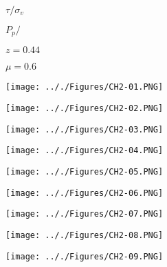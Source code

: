 \documentclass[onecolumn,11pt]{report}
\def\lthtmlcheckvsize{\ifdim\ht\sizebox<\vsize 
  \ifdim\wd\sizebox<\hsize\expandafter\hfill\fi \expandafter\vfill
  \else\expandafter\vss\fi}%
\begin{document}
{\newpage\clearpage
{}%
$ \tau / \sigma_v$%
\lthtmlindisplaymathZ
\lthtmlcheckvsize\clearpage}

{\newpage\clearpage
{}%
$ P_p/$%
\lthtmlindisplaymathZ
\lthtmlcheckvsize\clearpage}

{\newpage\clearpage
{}%
$ z = 0.44$%
\lthtmlindisplaymathZ
\lthtmlcheckvsize\clearpage}

{\newpage\clearpage
{}%
$ \mu = 0.6$%
\lthtmlindisplaymathZ
\lthtmlcheckvsize\clearpage}

{\newpage\clearpage
{}%
\texttt{[image: .././Figures/CH2-01.PNG]}%
\lthtmlpictureZ
\lthtmlcheckvsize\clearpage}

{\newpage\clearpage
{}%
\texttt{[image: .././Figures/CH2-02.PNG]}%
\lthtmlpictureZ
\lthtmlcheckvsize\clearpage}

{\newpage\clearpage
{}%
\texttt{[image: .././Figures/CH2-03.PNG]}%
\lthtmlpictureZ
\lthtmlcheckvsize\clearpage}

{\newpage\clearpage
{}%
\texttt{[image: .././Figures/CH2-04.PNG]}%
\lthtmlpictureZ
\lthtmlcheckvsize\clearpage}

{\newpage\clearpage
{}%
\texttt{[image: .././Figures/CH2-05.PNG]}%
\lthtmlpictureZ
\lthtmlcheckvsize\clearpage}

{\newpage\clearpage
{}%
\texttt{[image: .././Figures/CH2-06.PNG]}%
\lthtmlpictureZ
\lthtmlcheckvsize\clearpage}

{\newpage\clearpage
{}%
\texttt{[image: .././Figures/CH2-07.PNG]}%
\lthtmlpictureZ
\lthtmlcheckvsize\clearpage}

{\newpage\clearpage
{}%
\texttt{[image: .././Figures/CH2-08.PNG]}%
\lthtmlpictureZ
\lthtmlcheckvsize\clearpage}

{\newpage\clearpage
{}%
\texttt{[image: .././Figures/CH2-09.PNG]}%
\lthtmlpictureZ
\lthtmlcheckvsize\clearpage}
\end{document}
